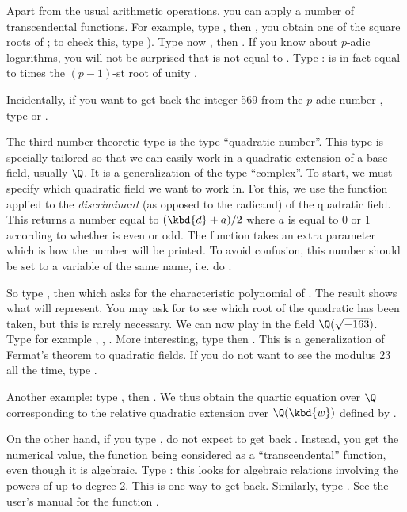 Apart from the usual arithmetic operations, you can apply a number of
transcendental functions. For example, type , then
, you obtain one of the square roots of ; to check
this, type ). Type now , then . If you know about $p$-adic logarithms, you will not be surprised
that  is not equal to . Type :  is in
fact equal to  times the $(p-1)$-st root of unity .

Incidentally, if you want to get back the integer 569 from the $p$-adic
number , type  or .
\smallskip

The third number-theoretic type is the type ``quadratic number''. This type
is specially tailored so that we can easily work in a quadratic extension of
a base field, usually $\Q$. It is a generalization of the type
``complex''. To start, we must specify which quadratic field we want to work
in. For this, we use the function  applied to the
\emph{discriminant}  (as opposed to the radicand) of the quadratic
field. This returns a number equal to
$(\kbd{d}+a) / 2$ where $a$ is equal to 0 or 1 according to whether  is
even or odd. The function  takes an extra parameter which is how
the number will be printed. To avoid confusion, this number should be
set to a variable of the same name, i.e. do .

So type , then  which asks for the
characteristic polynomial of . The result shows what  will
represent. You may ask for  to see which root of the quadratic has
been taken, but this is rarely necessary. We can now play in the field
$\Q(\sqrt{-163})$. Type for example , ,
. More interesting, type  then . This is a generalization of Fermat's theorem to quadratic fields.
If you do not want to see the modulus 23 all the time, type .

Another example: type , then . We
thus obtain the quartic equation over $\Q$ corresponding to the relative
quadratic extension over $\Q(\kbd{w})$ defined by .

On the other hand, if you type , do not expect to get
back . Instead, you get the numerical value, the function 
being considered as a ``transcendental'' function, even though it is
algebraic. Type : this looks for algebraic relations
involving the powers of  up to degree 2. This is one way to get
 back. Similarly, type . See the user's
manual for the function .\smallskip


